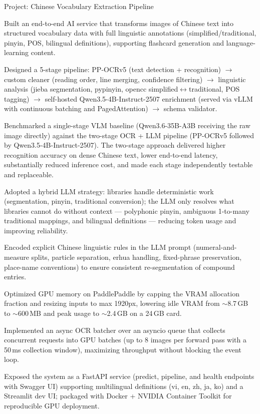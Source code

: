 \begin{cventries}
\vspace{8pt}

  \cventry
    {Project: Chinese Vocabulary Extraction Pipeline}
    {}
    {
      \begin{cvitems}
        \item {Built an end-to-end AI service that transforms images of Chinese text into structured vocabulary data with full linguistic annotations (simplified/traditional, pinyin, POS, bilingual definitions), supporting flashcard generation and language-learning content.}
        \item {Designed a 5-stage pipeline: PP-OCRv5 (text detection + recognition) $\rightarrow$ custom cleaner (reading order, line merging, confidence filtering) $\rightarrow$ linguistic analysis (jieba segmentation, pypinyin, opencc simplified$\leftrightarrow$traditional, POS tagging) $\rightarrow$ self-hosted Qwen3.5-4B-Instruct-2507 enrichment (served via vLLM with continuous batching and PagedAttention) $\rightarrow$ schema validator.}
        \item {Benchmarked a single-stage VLM baseline (Qwen3.6-35B-A3B receiving the raw image directly) against the two-stage OCR + LLM pipeline (PP-OCRv5 followed by Qwen3.5-4B-Instruct-2507). The two-stage approach delivered higher recognition accuracy on dense Chinese text, lower end-to-end latency, substantially reduced inference cost, and made each stage independently testable and replaceable.}
        \item {Adopted a hybrid LLM strategy: libraries handle deterministic work (segmentation, pinyin, traditional conversion); the LLM only resolves what libraries cannot do without context — polyphonic pinyin, ambiguous 1-to-many traditional mappings, and bilingual definitions — reducing token usage and improving reliability.}
        \item {Encoded explicit Chinese linguistic rules in the LLM prompt (numeral-and-measure splits, particle separation, erhua handling, fixed-phrase preservation, place-name conventions) to ensure consistent re-segmentation of compound entries.}
        \item {Optimized GPU memory on PaddlePaddle by capping the VRAM allocation fraction and resizing inputs to max 1920px, lowering idle VRAM from $\sim$8.7\,GB to $\sim$600\,MB and peak usage to $\sim$2.4\,GB on a 24\,GB card.}
        \item {Implemented an async OCR batcher over an asyncio queue that collects concurrent requests into GPU batches (up to 8 images per forward pass with a 50\,ms collection window), maximizing throughput without blocking the event loop.}
        \item {Exposed the system as a FastAPI service (predict, pipeline, and health endpoints with Swagger UI) supporting multilingual definitions (vi, en, zh, ja, ko) and a Streamlit dev UI; packaged with Docker + NVIDIA Container Toolkit for reproducible GPU deployment.}
      \end{cvitems}
    }

\end{cventries}

